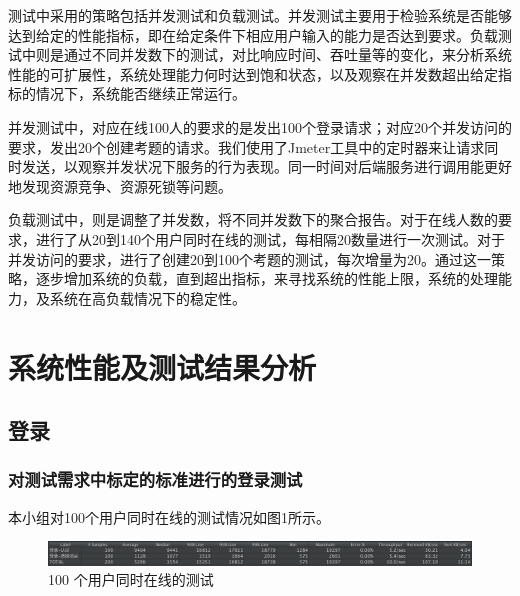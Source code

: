 \documentclass[hyperref, a4paper]{ctexart}
\begin{document}
测试中采用的策略包括并发测试和负载测试。并发测试主要用于检验系统是否能够达到给定的性能指标，即在给定条件下相应用户输入的能力是否达到要求。负载测试中则是通过不同并发数下的测试，对比响应时间、吞吐量等的变化，来分析系统性能的可扩展性，系统处理能力何时达到饱和状态，以及观察在并发数超出给定指标的情况下，系统能否继续正常运行。

并发测试中，对应在线100人的要求的是发出100个登录请求；对应20个并发访问的要求，发出20个创建考题的请求。我们使用了Jmeter工具中的定时器来让请求同时发送，以观察并发状况下服务的行为表现。同一时间对后端服务进行调用能更好地发现资源竞争、资源死锁等问题。

负载测试中，则是调整了并发数，将不同并发数下的聚合报告。对于在线人数的要求，进行了从20到140个用户同时在线的测试，每相隔20数量进行一次测试。对于并发访问的要求，进行了创建20到100个考题的测试，每次增量为20。通过这一策略，逐步增加系统的负载，直到超出指标，来寻找系统的性能上限，系统的处理能力，及系统在高负载情况下的稳定性。

\pagebreak

\hypertarget{ux7cfbux7edfux6027ux80fdux53caux6d4bux8bd5ux7ed3ux679cux5206ux6790}{%
\section{系统性能及测试结果分析}\label{ux7cfbux7edfux6027ux80fdux53caux6d4bux8bd5ux7ed3ux679cux5206ux6790}}

\hypertarget{ux767bux5f55}{%
\subsection{登录}\label{ux767bux5f55}}

\hypertarget{ux5bf9ux6d4bux8bd5ux9700ux6c42ux4e2dux6807ux5b9aux7684ux6807ux51c6ux8fdbux884cux7684ux767bux5f55ux6d4bux8bd5}{%
\subsubsection{对测试需求中标定的标准进行的登录测试}\label{ux5bf9ux6d4bux8bd5ux9700ux6c42ux4e2dux6807ux5b9aux7684ux6807ux51c6ux8fdbux884cux7684ux767bux5f55ux6d4bux8bd5}}

本小组对100个用户同时在线的测试情况如图1所示。

\begin{figure}
\centering
\includegraphics{resources/wcn/login_100.png}
\caption{100 个用户同时在线的测试}
\end{figure}
\end{document}
